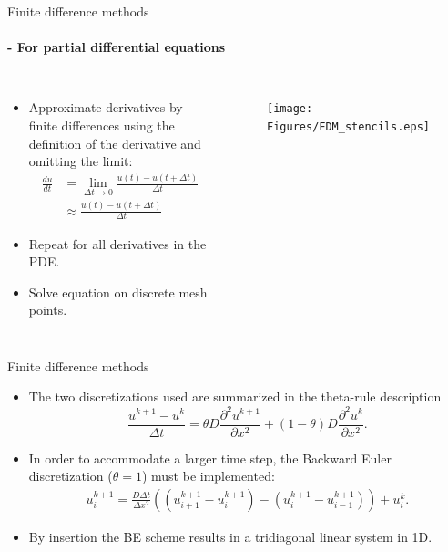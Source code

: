 \documentclass[12pt,a4paper, xcolor={usenames,dvipsnames,svgnames,table}]{beamer}
\renewcommand{\d}{\partial}
\begin{document}
\begin{frame}{Finite difference methods}
\framesubtitle{- For partial differential equations}
\begin{columns}
\begin{itemize}
\item<2-> Approximate derivatives by finite differences using the definition of the derivative and omitting the limit:
\begin{align*} 
 \frac{du}{dt} &=\lim_{\Delta t\to0} \frac{u(t) -u(t+\Delta t)}{\Delta t} \\
 &\approx \frac{u(t) -u(t+\Delta t)}{\Delta t}
\end{align*}
\item<3-> Repeat for all derivatives in the PDE.
\item<4-> Solve equation on discrete mesh points.
\end{itemize}

\begin{figure}
\centering
\texttt{[image: Figures/FDM\_stencils.eps]}
\end{figure}
\end{columns}
\end{frame}

\begin{frame}{Finite difference methods}

\begin{itemize}
\item<2->The two discretizations used are summarized in the theta-rule description 
\begin{equation}
 \frac{u^{k+1}-u^k}{\Delta t} = \theta D\frac{\d^2 u^{k+1}}{\d x^2} + (1-\theta)D\frac{\d^2 u^{k}}{\d x^2}.
\end{equation}
\item<3->In order to accommodate a larger time step, the Backward Euler discretization ($\theta =1$) must be implemented:
{\footnotesize
\begin{align*}
 u^{k+1}_i = \frac{D\Delta t}{\Delta x^2}\left((u^{k+1}_{i+1}-u^{k+1}_{i})-(u^{k+1}_{i}-u^{k+1}_{i-1})\right) + u^k_i.
\end{align*}
}
\item<4-> By insertion the BE scheme results in a tridiagonal linear system in 1D.
\end{itemize}
\end{frame}
\end{document}
